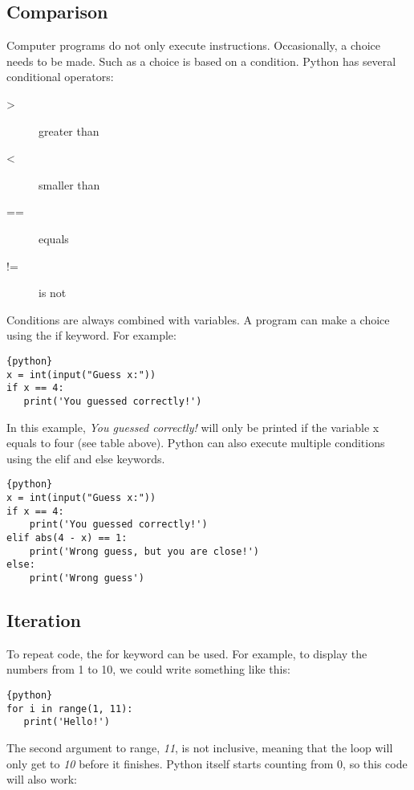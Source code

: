 \subsection{Comparison}\label{comparision}

Computer programs do not only execute instructions. Occasionally, a
choice needs to be made. Such as a choice is based on a condition.
Python has several conditional operators:

\begin{description}
\item[>]   greater than
\item[<]   smaller than
\item[==]  equals
\item[!=]  is not
\end{description}

Conditions are always combined with variables. A program can make a
choice using the if keyword. For example:

\begin{lstlisting}{python}
x = int(input("Guess x:"))
if x == 4:
   print('You guessed correctly!')
\end{lstlisting}

In this example, \emph{You guessed correctly!} will only be printed if
the variable x equals to four (see table above). Python can also execute
multiple conditions using the elif and else keywords.

\begin{lstlisting}{python}
x = int(input("Guess x:"))
if x == 4:
    print('You guessed correctly!')
elif abs(4 - x) == 1:
    print('Wrong guess, but you are close!')
else:
    print('Wrong guess')
\end{lstlisting}

\subsection{Iteration}\label{iteration}

To repeat code, the for keyword can be used. For example, to display the
numbers from 1 to 10, we could write something like this:

\begin{lstlisting}{python}
for i in range(1, 11):
   print('Hello!')
\end{lstlisting}

The second argument to range, \emph{11}, is not inclusive, meaning that
the loop will only get to \emph{10} before it finishes. Python itself
starts counting from 0, so this code will also work:


